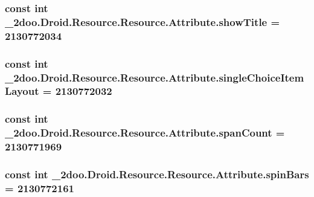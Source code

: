 \hypertarget{class__2doo_1_1_droid_1_1_resource_1_1_attribute_8e1f8bfceaaf74e067c18bfaa39bcf00}{
\subsubsection[{showTitle}]{\setlength{\rightskip}{0pt plus 5cm}const int \_\-2doo.Droid.Resource.Resource.Attribute.showTitle = 2130772034}}
\label{class__2doo_1_1_droid_1_1_resource_1_1_attribute_8e1f8bfceaaf74e067c18bfaa39bcf00}


\hypertarget{class__2doo_1_1_droid_1_1_resource_1_1_attribute_d0c01028ee3b08279ee76b3e8236a5bf}{
\subsubsection[{singleChoiceItemLayout}]{\setlength{\rightskip}{0pt plus 5cm}const int \_\-2doo.Droid.Resource.Resource.Attribute.singleChoiceItemLayout = 2130772032}}
\label{class__2doo_1_1_droid_1_1_resource_1_1_attribute_d0c01028ee3b08279ee76b3e8236a5bf}


\hypertarget{class__2doo_1_1_droid_1_1_resource_1_1_attribute_5f7dfefb5dac4c2a7be7b198e8bfcf49}{
\subsubsection[{spanCount}]{\setlength{\rightskip}{0pt plus 5cm}const int \_\-2doo.Droid.Resource.Resource.Attribute.spanCount = 2130771969}}
\label{class__2doo_1_1_droid_1_1_resource_1_1_attribute_5f7dfefb5dac4c2a7be7b198e8bfcf49}


\hypertarget{class__2doo_1_1_droid_1_1_resource_1_1_attribute_cd0fff652fc3ab436bd733dffa433377}{
\subsubsection[{spinBars}]{\setlength{\rightskip}{0pt plus 5cm}const int \_\-2doo.Droid.Resource.Resource.Attribute.spinBars = 2130772161}}
\label{class__2doo_1_1_droid_1_1_resource_1_1_attribute_cd0fff652fc3ab436bd733dffa433377}


